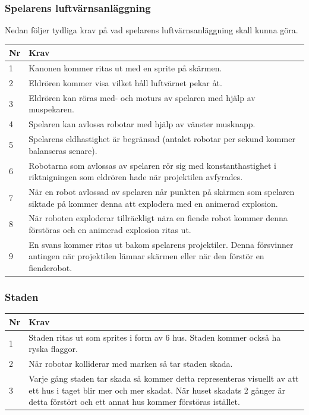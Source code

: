 \documentclass{TDP003mall}
\begin{document}
\subsubsection{Spelarens luftvärnsanläggning}
Nedan följer tydliga krav på vad spelarens luftvärnsanläggning skall kunna göra.
\begin{table}[!h]
\begin{tabularx}{\linewidth}{|l|X|}
\hline
Nr & Krav\\\hline
1 & Kanonen kommer ritas ut med en sprite på skärmen.\\\hline
2 & Eldrören kommer visa vilket håll luftvärnet pekar åt.\\\hline
3 & Eldrören kan röras med- och moturs av spelaren med hjälp av muspekaren.\\\hline
4 & Spelaren kan avlossa robotar med hjälp av vänster musknapp.\\\hline
5 & Spelarens eldhastighet är begränsad (antalet robotar per sekund kommer balanseras senare).\\\hline
6 & Robotarna som avlossas av spelaren rör sig med konstanthastighet i riktnigningen som eldrören hade när projektilen avfyrades.\\\hline
7 & När en robot avlossad av spelaren når punkten på skärmen som spelaren siktade på kommer denna att explodera med en animerad explosion.\\\hline
8 & När roboten exploderar tillräckligt nära en fiende robot kommer denna förstöras och en animerad explosion ritas ut.\\\hline
9 & En svans kommer ritas ut bakom spelarens projektiler. Denna försvinner antingen när projektilen lämnar skärmen eller när den förstör en fienderobot.\\\hline
\end{tabularx}
\end{table}

\subsubsection{Staden}
\begin{table}[!h]
\begin{tabularx}{\linewidth}{|l|X|}
\hline
Nr & Krav\\\hline
1 & Staden ritas ut som sprites i form av 6 hus. Staden kommer också ha ryska flaggor.\\\hline
2 & När robotar kolliderar med marken så tar staden skada.\\\hline
3 & Varje gång staden tar skada så kommer detta representeras visuellt av att ett hus i taget blir mer och mer skadat. När huset skadats 2 gånger är detta förstört och ett annat hus kommer förstöras istället.\\\hline
\end{tabularx}
\end{table}
\end{document}

